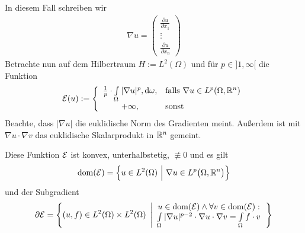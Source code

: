 \begin{beispiel}
	In diesem Fall schreiben wir
	\begin{align*}
		\nabla u=\begin{pmatrix}
			\frac{\partial u}{\partial x_1}\\
			\vdots\\
			\frac{\partial u}{\partial x_n}
		\end{pmatrix}
	\end{align*}
	Betrachte nun auf dem Hilbertraum $H:=L^2(\Omega)$ und für $p\in]1,\infty[$ die Funktion
	\begin{align*}
		\mathcal{E}(u):=\left\lbrace\begin{array}{cl}
			\frac{1}{p}\cdot\int\limits_\Omega |\nabla u|^p,\mathrm{d}\omega, &\text{falls } \nabla u\in L^p(\Omega,\mathbb{R}^n)\\
			+\infty, &\text{sonst }
		\end{array}\right.
	\end{align*}
	Beachte, dass $|\nabla u|$ die euklidische Norm des Gradienten meint. 
	Außerdem ist mit $\nabla u\cdot\nabla v$ das euklidische Skalarprodukt in $\mathbb{R}^n$ gemeint.

	\begin{lemma} %
		Diese Funktion $\mathcal{E}$ ist konvex, unterhalbstetig, $\not\equiv0$ und es gilt
		\begin{align*}
			\operatorname{dom}(\mathcal{E})=\Big\lbrace u\in L^2(\Omega)~\Big|~\nabla u\in L^p\big(\Omega,\mathbb{R}^n\big)\Big\rbrace
		\end{align*}
		und der Subgradient
		\begin{align*}
			\partial\mathcal{E}=\left\lbrace(u,f)\in L^2(\Omega)\times L^2(\Omega)~\left|
			\begin{array}{c}
				u\in\operatorname{dom}(\mathcal{E})\wedge\forall v\in\operatorname{dom}(\mathcal{E}):\\
				\int\limits_\Omega|\nabla u|^{p-2}\cdot\nabla u\cdot\nabla v=\int\limits_\Omega f\cdot v
			\end{array}
			\right.\right\rbrace
		\end{align*}
	\end{lemma}
	

\end{beispiel}
